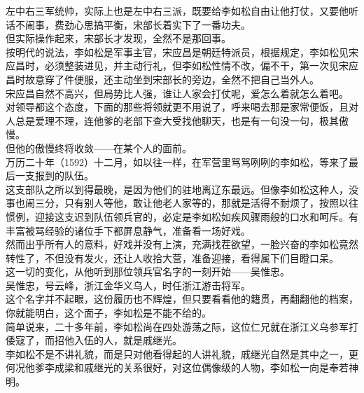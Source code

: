 \begin{multicols}{\theparacolNo}
左中右三军统帅，实际上也是左中右三派，既要给李如松自由让他打仗，又要他听话不闹事，费劲心思搞平衡，宋部长着实下了一番功夫。\\

但实际操作起来，宋部长才发现，全然不是那回事。\\

按明代的说法，李如松是军事主官，宋应昌是朝廷特派员，根据规定，李如松见宋应昌时，必须整装进见，并主动行礼，但李如松性情不改，偏不干，第一次见宋应昌时故意穿了件便服，还主动坐到宋部长的旁边，全然不把自己当外人。\\

宋应昌自然不高兴，但局势比人强，谁让人家会打仗呢，爱怎么着就怎么着吧。\\

对领导都这个态度，下面的那些将领就更不用说了，呼来喝去那是家常便饭，且对人总是爱理不理，连他爹的老部下查大受找他聊天，也是有一句没一句，极其傲慢。\\

但他的傲慢终将收敛——在某个人的面前。\\

万历二十年（1592）十二月，如以往一样，在军营里骂骂咧咧的李如松，等来了最后一支报到的队伍。\\

这支部队之所以到得最晚，是因为他们的驻地离辽东最远。但像李如松这种人，没事也闹三分，只有别人等他，敢让他老人家等的，那就是活得不耐烦了，按照以往惯例，迎接这支迟到队伍领兵官的，必定是李如松如疾风骤雨般的口水和呵斥。有丰富被骂经验的诸位手下都屏息静气，准备看一场好戏。\\

然而出乎所有人的意料，好戏并没有上演，充满找茬欲望，一脸兴奋的李如松竟然转性了，不但没有发火，还让人收拾大营，准备迎接，看得属下们目瞪口呆。\\

这一切的变化，从他听到那位领兵官名字的一刻开始——吴惟忠。\\

吴惟忠，号云峰，浙江金华义乌人，时任浙江游击将军。\\

这个名字并不起眼，这份履历也不辉煌，但只要看看他的籍贯，再翻翻他的档案，你就能明白，这个面子，李如松是不能不给的。\\

简单说来，二十多年前，李如松尚在四处游荡之际，这位仁兄就在浙江义乌参军打倭寇了，而招他入伍的人，就是戚继光。\\

李如松不是不讲礼貌，而是只对他看得起的人讲礼貌，戚继光自然是其中之一，更何况他爹李成梁和戚继光的关系很好，对这位偶像级的人物，李如松一向是奉若神明。\\


\end{multicols}
